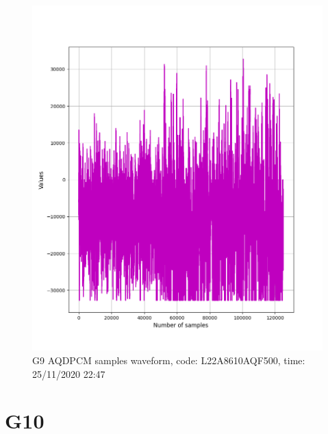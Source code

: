 \documentclass[hidelinks, 12pt, a4paper]{article}
\begin{document}
\begin{figure}[h!]
\centering
	\includegraphics[height=.4\textheight, width=\textwidth]{assets/session1/g9_aq.png}
	\caption{G9 AQDPCM samples waveform, code: L22A8610AQF500, time: 25/11/2020 22:47} 
\end{figure}


\section{G10}
\end{document}
